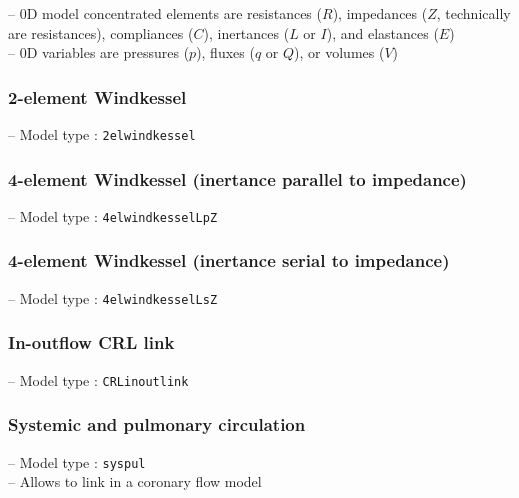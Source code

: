 \documentclass[a4paper,12pt]{report}
\begin{document}
-- 0D model concentrated elements are resistances ($R$), impedances ($Z$, technically are resistances), compliances ($C$), inertances ($L$ or $I$), and elastances ($E$)\\

-- 0D variables are pressures ($p$), fluxes ($q$ or $Q$), or volumes ($V$)

\subsubsection{2-element Windkessel}

-- Model type : \verb"2elwindkessel"\\

\subsubsection{4-element Windkessel (inertance parallel to impedance)}

-- Model type : \verb"4elwindkesselLpZ"\\

\subsubsection{4-element Windkessel (inertance serial to impedance)}

-- Model type : \verb"4elwindkesselLsZ"\\

\subsubsection{In-outflow CRL link}

-- Model type : \verb"CRLinoutlink"\\

\subsubsection{Systemic and pulmonary circulation}

-- Model type : \verb"syspul"\\

-- Allows to link in a coronary flow model
\end{document}
